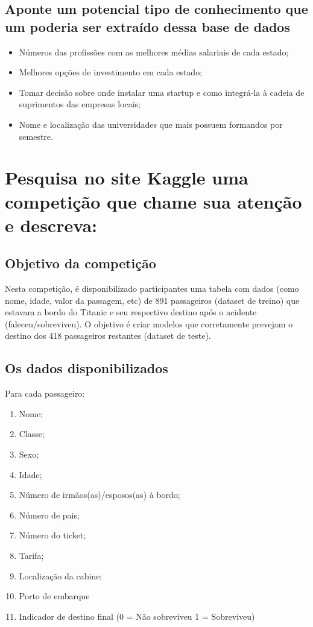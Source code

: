 \documentclass{article}
\begin{document}
\subsection{Aponte um potencial tipo de conhecimento que um poderia ser extraído dessa base de dados}
\begin{itemize}
    \item Números das profissões com as melhores médias salariais de cada estado;
    \item Melhores opções de investimento em cada estado;
    \item Tomar decisão sobre onde instalar uma startup e como integrá-la à cadeia de suprimentos das empresas locais;
    \item Nome e localização das universidades que mais possuem formandos por semestre.
\end{itemize}

\section{Pesquisa no site Kaggle uma competição que chame sua atenção e descreva:}
\subsection{Objetivo da competição}
Nesta competição, é disponibilizado participantes uma tabela com dados (como nome, idade, valor da passagem, etc) de 891 passageiros (dataset de treino) que estavam a bordo do Titanic e seu respectivo destino após o acidente (faleceu/sobreviveu). O objetivo é criar modelos que corretamente prevejam o destino dos 418 passageiros restantes (dataset de teste).
\subsection{Os dados disponibilizados}
Para cada passageiro:
\begin{enumerate}
    \item Nome;
    \item Classe;
    \item Sexo;
    \item Idade;
    \item Número de irmãos(as)/esposos(as) à bordo;
    \item Número de pais;
    \item Número do ticket;
    \item Tarifa;
    \item Localização da cabine;
    \item Porto de embarque
    \item Indicador de destino final (0 = Não sobreviveu 1 = Sobreviveu)
\end{enumerate}
\end{document}
